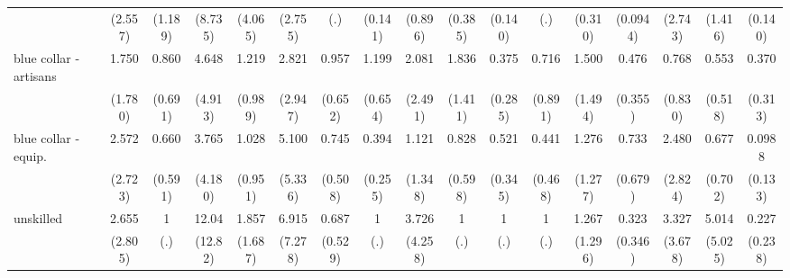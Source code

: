 {\begin{tabular}{l*{16}{c}}
                    &     (2.557)         &     (1.189)         &     (8.735)         &     (4.065)         &     (2.755)         &         (.)         &     (0.141)         &     (0.896)         &     (0.385)         &     (0.140)         &         (.)         &     (0.310)         &    (0.0944)         &     (2.743)         &     (1.416)         &     (0.140)         \\
[1em]
blue collar - artisans&       1.750         &       0.860         &       4.648         &       1.219         &       2.821         &       0.957         &       1.199         &       2.081         &       1.836         &       0.375         &       0.716         &       1.500         &       0.476         &       0.768         &       0.553         &       0.370         \\
                    &     (1.780)         &     (0.691)         &     (4.913)         &     (0.989)         &     (2.947)         &     (0.652)         &     (0.654)         &     (2.491)         &     (1.411)         &     (0.285)         &     (0.891)         &     (1.494)         &     (0.355)         &     (0.830)         &     (0.518)         &     (0.313)         \\
[1em]
blue collar - equip.&       2.572         &       0.660         &       3.765         &       1.028         &       5.100         &       0.745         &       0.394         &       1.121         &       0.828         &       0.521         &       0.441         &       1.276         &       0.733         &       2.480         &       0.677         &      0.0988         \\
                    &     (2.723)         &     (0.591)         &     (4.180)         &     (0.951)         &     (5.336)         &     (0.508)         &     (0.255)         &     (1.348)         &     (0.598)         &     (0.345)         &     (0.468)         &     (1.277)         &     (0.679)         &     (2.824)         &     (0.702)         &     (0.133)         \\
[1em]
unskilled           &       2.655         &           1         &       12.04\sym{*}  &       1.857         &       6.915         &       0.687         &           1         &       3.726         &           1         &           1         &           1         &       1.267         &       0.323         &       3.327         &       5.014         &       0.227         \\
                    &     (2.805)         &         (.)         &     (12.82)         &     (1.687)         &     (7.278)         &     (0.529)         &         (.)         &     (4.258)         &         (.)         &         (.)         &         (.)         &     (1.296)         &     (0.346)         &     (3.678)         &     (5.025)         &     (0.238)         \\

\end{tabular}}
